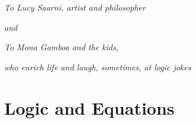 \documentclass[letterpaper,10pt,extrafontsizesmtwoside,onecolumn,openright,fleqn]{memoir}
\begin{document}
\endgroup

\clearpage

\vspace*{\fill}

\hspace*{15mm}\normalsize\textsf{\emph{To Lucy Saarni, artist and philosopher}}\par
\vspace{2mm}
\hspace*{4cm}\normalsize\textsf{\emph{and}}\par
\vspace{2mm}
\hspace*{15mm}\normalsize\textsf{\emph{To Mona Gamboa and the kids,}}\par
\hspace*{46mm}\normalsize\textsf{\emph{who enrich life and laugh, sometimes, at logic jokes}}\par

\vspace*{\fill}

\cleardoublepage

\pagestyle{headings}

\setupshorttoc
\tableofcontents
\clearpage

\setupparasubsecs
\setupmaintoc
\tableofcontents



\clearpage
\listoffigures

\clearpage
\listofasides

\clearpage




\mainmatter

\raggedbottom

\part{Logic and Equations}








\end{document}
